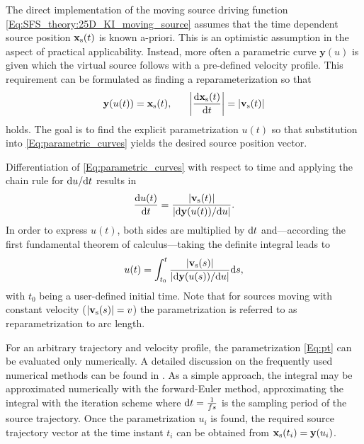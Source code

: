 The direct implementation of the moving source driving function \eqref{Eq:SFS_theory:25D_KI_moving_source} assumes that the time dependent source position $\mathbf{x}_{\mathrm{s}}(t)$ is known a-priori. 
This is an optimistic assumption in the aspect of practical applicability. 
Instead, more often a parametric curve $\mathbf{y}(u)$ is given which the virtual source follows with a pre-defined velocity profile.
This requirement can be formulated as finding a reparameterization so that 
\begin{equation}
\mathbf{y}(u(t)) = \mathbf{x}_{\mathrm{s}}(t), \hspace{6mm} \left| \frac{\mathrm{d} \mathbf{x}_{\mathrm{s}}(t)}{\mathrm{d} t} \right| = |\mathbf{v}_{\mathrm{s}}(t)| 
\label{Eq:parametric_curves}
\end{equation}
holds. 
The goal is to find the explicit parametrization $u(t)$ so that substitution into \eqref{Eq:parametric_curves} yields the desired source position vector.

Differentiation of \eqref{Eq:parametric_curves} with respect to time and applying the chain rule for $\mathrm{d} u / \mathrm{d} t$ results in
\begin{equation}
 \frac{\mathrm{d} u(t) }{\mathrm{d} t} = \frac{|\mathbf{v}_{\mathrm{s}}(t)|}{\left| \mathrm{d} \mathbf{y}(u(t)) / \mathrm{d} u \right|}.
\end{equation}
In order to express $u(t)$, both sides are multiplied by $\mathrm{d} t$ and---according the first fundamental theorem of calculus---taking the definite integral leads to
\begin{equation}
u(t) = \int_{t_0}^{t} \frac{|\mathbf{v}_{\mathrm{s}}(s)|}{\left| \mathrm{d} \mathbf{y}(u(s)) / \mathrm{d} u \right|} \mathrm{d} s,
\label{Eq:pt}
\end{equation}
with $t_0$ being a user-defined initial time.
Note that for sources moving with constant velocity ($|\mathbf{v}_{\mathrm{s}}(s)| = v$) the parametrization is referred to as reparametrization to arc length.

For an arbitrary trajectory and velocity profile, the parametrization \eqref{Eq:pt} can be evaluated only numerically.
A detailed discussion on the frequently used numerical methods can be found in \cite{Parent2012}.
As a simple approach, the integral may be approximated numerically with the forward-Euler method, approximating the integral with the iteration scheme
where $\mathrm{d} t = \frac{1}{fs}$ is the sampling period of the source trajectory.
Once the parametrization $u_i$ is found, the required source trajectory vector at the time instant $t_i$ can be obtained from $\mathbf{x}_{\mathrm{s}}(t_i) = \mathbf{y}(u_i)$. 

